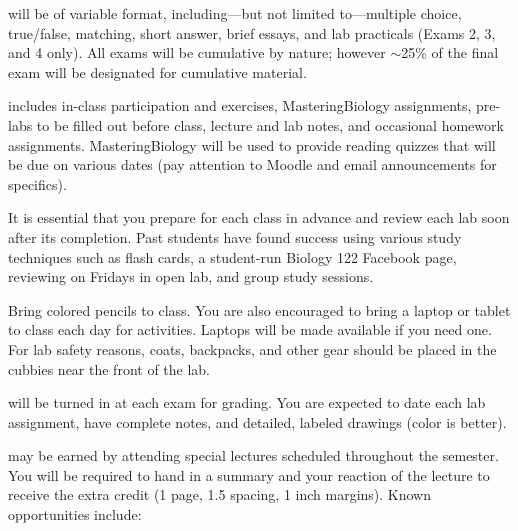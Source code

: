 \documentclass{tufte-handout}
\begin{document}
\begin{fullwidth}




 will be of variable format, including---but not limited to---multiple choice, true/false, matching, short answer, brief essays, and lab practicals (Exams 2, 3, and 4 only). All exams will be cumulative by nature; however $\sim$25\% of the final exam will be designated for cumulative material. 

 includes in-class participation and exercises, MasteringBiology assignments, pre-labs to be filled out before class, lecture and lab notes, and occasional homework assignments. MasteringBiology will be used to provide reading quizzes that will be due on various dates (pay attention to Moodle and email announcements for specifics). 

It is essential that you prepare for each class in advance and review each lab soon after its completion. Past students have found success using various study techniques such as flash cards, a student-run Biology 122 Facebook page, reviewing on Fridays in open lab, and group study sessions. 

Bring colored pencils to class. You are also encouraged to bring a laptop or tablet to class each day for activities. Laptops will be made available if you need one. For lab safety reasons, coats, backpacks, and other gear should be placed in the cubbies near the front of the lab. 

 will be turned in at each exam for grading. You are expected to date each lab assignment, have complete notes, and detailed, labeled drawings (color is better).  

 may be earned by attending special lectures scheduled throughout the semester.  You will be required to hand in a summary and your reaction of the lecture to receive the extra credit (1 page, 1.5 spacing, 1 inch margins). Known opportunities include:


\end{fullwidth}
\end{document}
